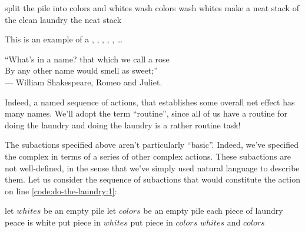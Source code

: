 \begin{codebox}
\li split the pile into colors and whites\label{code:do-the-laundry:1}
\li wash colors
\li wash whites
\li make a neat stack of the clean laundry
\li \Return the neat stack
\end{codebox}

This is an example of a , , ,
, , \ldots

\begin{flushright}

``What's in a name? that which we call a rose\\
By any other name would smell as sweet;''\\
--- William Shakespeare, Romeo and Juliet.

\end{flushright}

Indeed, a named sequence of actions, that establishes some overall net effect
has many names. We'll adopt the term ``routine'', since all of us have a
routine for doing the laundry and doing the laundry is a rather routine task!

The subactions specified above aren't particularly ``basic''. Indeed, we've
specified the complex  in terms of a series of other
complex actions. These subactions are not well-defined, in the sense that we've
simply used natural language to describe them. Let us consider the sequence of
subactions that would constitute the action on line
\ref{code:do-the-laundry:1}:

\begin{codebox}
\li let $whites$ be an empty pile
\li let $colors$ be an empty pile
\li \For each piece of laundry \Do
\li \If peace is white \Then
\li put piece in $whites$
\li \Else
\li put piece in $colors$
\End
\End
\li \Return $whites$ and $colors$
\end{codebox}

